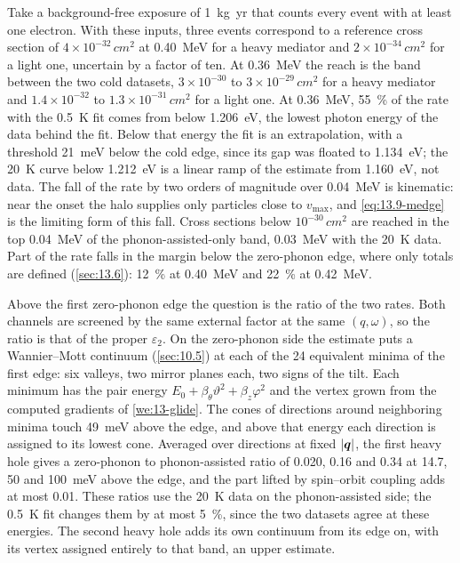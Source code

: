 Take a background-free exposure of \SI{1}{kg.yr} that counts every event with at least one electron. With these inputs, three events correspond to a reference cross section of $4\times10^{-32}\,\si{cm^2}$ at \SI{0.40}{MeV} for a heavy mediator and $2\times10^{-34}\,\si{cm^2}$ for a light one, uncertain by a factor of ten. At \SI{0.36}{MeV} the reach is the band between the two cold datasets, $3\times10^{-30}$ to $3\times10^{-29}\,\si{cm^2}$ for a heavy mediator and $1.4\times10^{-32}$ to $1.3\times10^{-31}\,\si{cm^2}$ for a light one. At \SI{0.36}{MeV}, \SI{55}{\percent} of the rate with the \SI{0.5}{K} fit comes from below \SI{1.206}{eV}, the lowest photon energy of the data behind the fit. Below that energy the fit is an extrapolation, with a threshold \SI{21}{meV} below the cold edge, since its gap was floated to \SI{1.134}{eV}; the \SI{20}{K} curve below \SI{1.212}{eV} is a linear ramp of the estimate from \SI{1.160}{eV}, not data. The fall of the rate by two orders of magnitude over \SI{0.04}{MeV} is kinematic: near the onset the halo supplies only particles close to $v_{\mathrm{max}}$, and \cref{eq:13.9-medge} is the limiting form of this fall. Cross sections below $10^{-30}\,\si{cm^2}$ are reached in the top \SI{0.04}{MeV} of the phonon-assisted-only band, \SI{0.03}{MeV} with the \SI{20}{K} data. Part of the rate falls in the margin below the zero-phonon edge, where only totals are defined (\cref{sec:13.6}): \SI{12}{\percent} at \SI{0.40}{MeV} and \SI{22}{\percent} at \SI{0.42}{MeV}.

Above the first zero-phonon edge the question is the ratio of the two rates. Both channels are screened by the same external factor at the same $(q,\omega)$, so the ratio is that of the proper $\varepsilon_2$. On the zero-phonon side the estimate puts a Wannier--Mott continuum (\cref{sec:10.5}) at each of the 24 equivalent minima of the first edge: six valleys, two mirror planes each, two signs of the tilt. Each minimum has the pair energy $E_0 + \beta_\theta\vartheta^2 + \beta_z\varphi^2$ and the vertex grown from the computed gradients of \cref{we:13-glide}. The cones of directions around neighboring minima touch \SI{49}{meV} above the edge, and above that energy each direction is assigned to its lowest cone. Averaged over directions at fixed $|\bm{q}|$, the first heavy hole gives a zero-phonon to phonon-assisted ratio of 0.020, 0.16 and 0.34 at 14.7, 50 and \SI{100}{meV} above the edge, and the part lifted by spin--orbit coupling adds at most 0.01. These ratios use the \SI{20}{K} data on the phonon-assisted side; the \SI{0.5}{K} fit changes them by at most \SI{5}{\percent}, since the two datasets agree at these energies. The second heavy hole adds its own continuum from its edge on, with its vertex assigned entirely to that band, an upper estimate.


